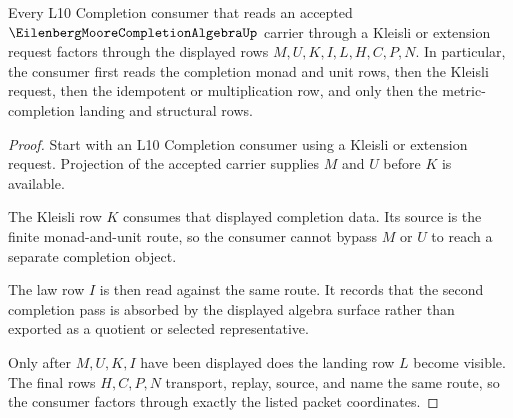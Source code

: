\begin{theorem}
\label{thm:eilenberg-moore-completion-algebra-kleisli-consumption}
Every L10 Completion consumer that reads an accepted $\EilenbergMooreCompletionAlgebraUp$ carrier through a Kleisli or extension request factors through the displayed rows $M,U,K,I,L,H,C,P,N$. In particular, the consumer first reads the completion monad and unit rows, then the Kleisli request, then the idempotent or multiplication row, and only then the metric-completion landing and structural rows.
\end{theorem}
\begin{proof}
Start with an L10 Completion consumer using a Kleisli or extension request. Projection of the accepted carrier supplies $M$ and $U$ before $K$ is available.

The Kleisli row $K$ consumes that displayed completion data. Its source is the finite monad-and-unit route, so the consumer cannot bypass $M$ or $U$ to reach a separate completion object.

The law row $I$ is then read against the same route. It records that the second completion pass is absorbed by the displayed algebra surface rather than exported as a quotient or selected representative.

Only after $M,U,K,I$ have been displayed does the landing row $L$ become visible. The final rows $H,C,P,N$ transport, replay, source, and name the same route, so the consumer factors through exactly the listed packet coordinates.
\end{proof}

